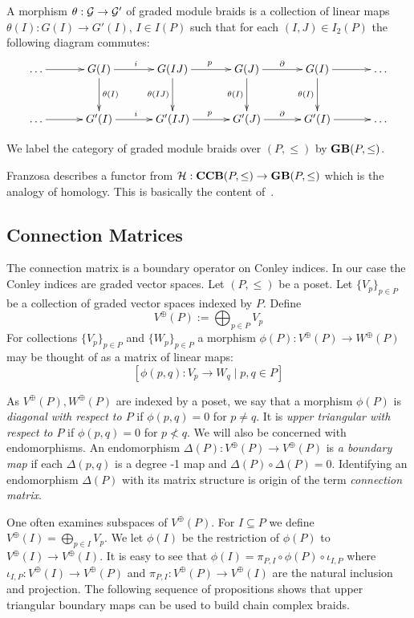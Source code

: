 A morphism $\theta:{\mathcal G}\to {\mathcal G}'$ of graded module braids is a collection of linear maps $\theta(I):G(I)\to G'(I)$, $I\in I(P)$ such that for each $(I,J)\in I_2(P)$ the following diagram commutes:
\[
\xymatrixrowsep{0.4in}
\xymatrixcolsep{0.45in}
\xymatrix{
\ldots \ar@{->}[r] & G(I) \ar@{->}[d]^{\theta(I)} \ar@{->}[r]^{i} & G(IJ) \ar@{->}[d]_{\theta(IJ)} \ar@{->}[r]^{p} & G(J) \ar@{->}[d]_{\theta(I)} \ar@{->}[r]^{\partial} & G(I) \ar@{->}[d]_{\theta(I)} \ar@{->}[r] & \ldots\\
\ldots \ar@{->}[r] & G'(I) \ar@{->}[r]^{i} & G'(IJ) \ar@{->}[r]^{p} & G'(J) \ar@{->}[r]^{\partial} & G'(I) \ar@{->}[r] &\ldots
}
\]

We label the category of graded module braids over $(P,\leq)$ by ${\bf GB}(P,\leq)$.

Franzosa describes a functor from ${\mathcal H}:{\bf CCB}(P,\leq)\to {\bf GB}(P,\leq)$ which is the analogy of homology.  This is basically the content of~\cite[Proposition 2.7]{fran}.

\subsection{Connection Matrices}

The connection matrix is a boundary operator on Conley indices.  In our case the Conley indices are graded vector spaces.  Let $(P,\leq)$ be a poset.  Let $\{V_p\}_{p\in P}$ be a collection of graded vector spaces indexed by $P$.  Define $$V^\oplus(P) := \bigoplus_{p\in P} V_p$$  For collections $\{V_p\}_{p\in P}$ and $\{W_p\}_{p\in P}$ a morphism $\phi(P):V^\oplus(P)\to W^\oplus(P)$ may be thought of as a matrix of linear maps: $$[\phi(p,q):V_p\to W_q\mid p,q\in P]$$


As $V^\oplus(P),W^\oplus(P)$ are indexed by a poset, we say that a morphism $\phi(P)$ is {\em diagonal with respect to $P$} if $\phi(p,q)=0$ for $p\neq q$.  It is {\em upper triangular with respect to $P$} if $\phi(p,q)=0$ for $p\nless q$.  We will also be concerned with endomorphisms.  An endomorphism $\Delta(P):V^\oplus(P)\to V^\oplus(P)$ is {\em a boundary map} if each $\Delta(p,q)$ is a degree -1 map and $\Delta(P)\circ \Delta(P) = 0$.  Identifying an endomorphism $\Delta(P)$ with its matrix structure is origin of the term {\em connection matrix}.  

One often examines subspaces of $V^\oplus(P)$.  For $I\subseteq P$ we define $V^\oplus(I)= \bigoplus_{p\in I} V_p$.  We let $\phi(I)$ be the restriction of $\phi(P)$ to $V^\oplus(I)\to V^\oplus(I)$.  It is easy to see that $\phi(I) = \pi_{P,I} \circ \phi(P) \circ \iota_{I,P}$ where $\iota_{I,P}:V^\oplus(I)\to V^\oplus(P)$ and $\pi_{P,I}:V^\oplus(P)\to V^\oplus(I)$ are the natural inclusion and projection.  The following sequence of propositions shows that upper triangular boundary maps can be used to build chain complex braids.




